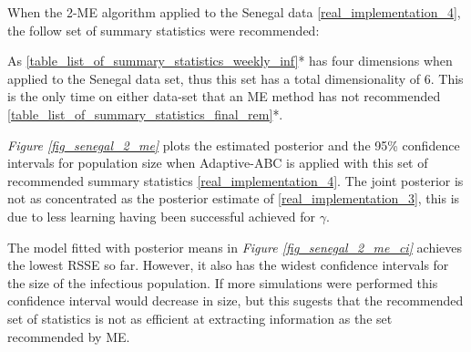 \documentclass[11pt,a4paper]{article}
\theoremstyle{break}
\begin{document}
  \par When the 2-ME algorithm applied to the Senegal data \ref{real_implementation_4}, the follow set of summary statistics were recommended:

  \begin{center}
  \end{center}

  \noindent As \ref{table_list_of_summary_statistics_weekly_inf}* has four dimensions when applied to the Senegal data set, thus this set has a total dimensionality of 6. This is the only time on either data-set that an ME method has not recommended \ref{table_list_of_summary_statistics_final_rem}*.

  \par \textit{Figure \ref{fig_senegal_2_me}} plots the estimated posterior and the 95\% confidence intervals for population size when Adaptive-ABC is applied with this set of recommended summary statistics \ref{real_implementation_4}. The joint posterior is not as concentrated as the posterior estimate of \ref{real_implementation_3}, this is due to less learning having been successful achieved for $\gamma$.

  \par The model fitted with posterior means in \textit{Figure \ref{fig_senegal_2_me_ci}} achieves the lowest RSSE so far. However, it also has the widest confidence intervals for the size of the infectious population. If more simulations were performed this confidence interval would decrease in size, but this sugests that the recommended set of statistics is not as efficient at extracting information as the set recommended by ME.
\end{document}

